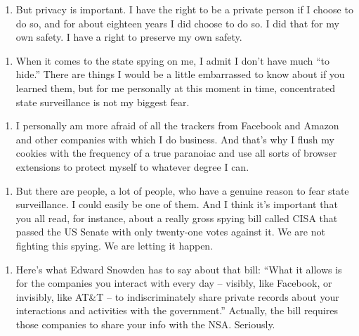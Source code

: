 \begin{enumerate}
\def\labelenumi{\arabic{enumi}.}
\setcounter{enumi}{2}
\tightlist
\item
  But privacy is important. I have the right to be a private person if I
  choose to do so, and for about eighteen years I did choose to do so. I
  did that for my own safety. I have a right to preserve my own safety.
\end{enumerate}

\begin{enumerate}
\def\labelenumi{\arabic{enumi}.}
\setcounter{enumi}{3}
\tightlist
\item
  When it comes to the state spying on me, I admit I don't have much
  ``to hide.'' There are things I would be a little embarrassed to know
  about if you learned them, but for me personally at this moment in
  time, concentrated state surveillance is not my biggest fear.
\end{enumerate}

\begin{enumerate}
\def\labelenumi{\arabic{enumi}.}
\setcounter{enumi}{4}
\tightlist
\item
  I personally am more afraid of all the trackers from Facebook and
  Amazon and other companies with which I do business. And that's why I
  flush my cookies with the frequency of a true paranoiac and use all
  sorts of browser extensions to protect myself to whatever degree I
  can.
\end{enumerate}

\begin{enumerate}
\def\labelenumi{\arabic{enumi}.}
\setcounter{enumi}{5}
\tightlist
\item
  But there are people, a lot of people, who have a genuine reason to
  fear state surveillance. I could easily be one of them. And I think
  it's important that you all read, for instance, about a really gross
  spying bill called CISA that passed the US Senate with only twenty-one
  votes against it. We are not fighting this spying. We are letting it
  happen.
\end{enumerate}

\begin{enumerate}
\def\labelenumi{\arabic{enumi}.}
\setcounter{enumi}{6}
\tightlist
\item
  Here's what Edward Snowden has to say about that bill: ``What it
  allows is for the companies you interact with every day -- visibly,
  like Facebook, or invisibly, like AT\&T -- to indiscriminately share
  private records about your interactions and activities with the
  government.'' Actually, the bill requires those companies to share
  your info with the NSA. Seriously.
\end{enumerate}

